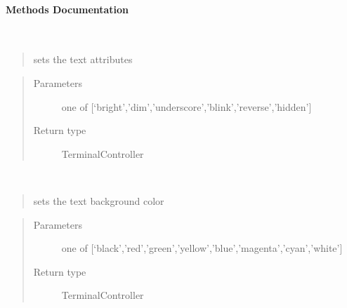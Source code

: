 \documentclass[a4paper,10pt,english]{sphinxmanual}
\begin{document}
\begin{fulllineitems}
\paragraph{Methods Documentation}

\begin{fulllineitems}
\label{\detokenize{api/termtools.terminal.TerminalController:termtools.terminal.TerminalController.attrib}}~\begin{quote}

sets the text attributes
\end{quote}
\begin{quote}\begin{description}
\item[{Parameters}] \leavevmode
{} \textendash{} one of {[}‘bright’,’dim’,’underscore’,’blink’,’reverse’,’hidden’{]}

\item[{Return type}] \leavevmode
TerminalController

\end{description}\end{quote}

\end{fulllineitems}


\begin{fulllineitems}
\label{\detokenize{api/termtools.terminal.TerminalController:termtools.terminal.TerminalController.background}}~\begin{quote}

sets the text background color
\end{quote}
\begin{quote}\begin{description}
\item[{Parameters}] \leavevmode
{} \textendash{} one of {[}‘black’,’red’,’green’,’yellow’,’blue’,’magenta’,’cyan’,’white’{]}

\item[{Return type}] \leavevmode
TerminalController

\end{description}\end{quote}


\end{fulllineitems}
\end{fulllineitems}
\end{document}
